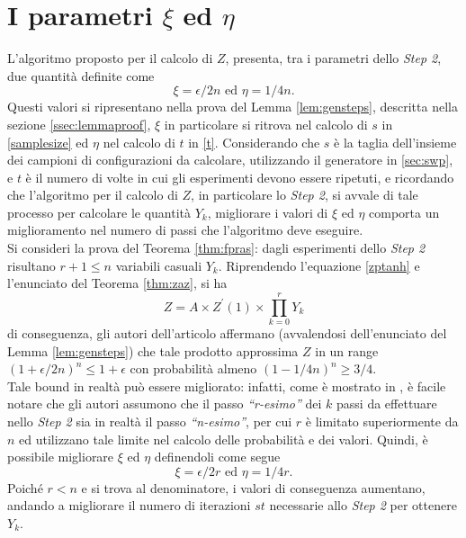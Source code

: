 \section{I parametri $\xi$ ed $\eta$}
L'algoritmo proposto per il calcolo di $Z$, presenta, tra i parametri dello \textit{Step 2}, due quantità definite come
\begin{equation}
	\xi = \epsilon/2n \text{ ed } \eta = 1/4n.
	\label{xieta}
\end{equation}
Questi valori si ripresentano nella prova del Lemma \ref{lem:gensteps}, descritta nella sezione \ref{ssec:lemmaproof}, $\xi$ in particolare si ritrova nel calcolo di $s$ in \ref{samplesize} ed $\eta$ nel calcolo di $t$ in \ref{t}.
Considerando che $s$ è la taglia dell'insieme dei campioni di configurazioni da calcolare, utilizzando il generatore in \ref{sec:swp}, e $t$ è il numero di volte in cui gli esperimenti devono essere ripetuti, e ricordando che l'algoritmo per il calcolo di $Z$, in particolare lo \textit{Step 2}, si avvale di tale processo per calcolare le quantità $Y_k$, migliorare i valori di $\xi$ ed $\eta$ comporta un miglioramento nel numero di passi che l'algoritmo deve eseguire.\\
Si consideri la prova del Teorema \ref{thm:fpras}: dagli esperimenti dello \textit{Step 2} risultano $r + 1 \leq n$ variabili casuali $Y_k$. Riprendendo l'equazione \ref{zptanh} e l'enunciato del Teorema \ref{thm:zaz}, si ha
\begin{equation}
	Z = A \times Z^{\prime}(1) \times \prod_{k=0}^{r}{Y_k}
	\label{zazuno}
\end{equation}
di conseguenza, gli autori dell'articolo affermano (avvalendosi dell'enunciato del Lemma \ref{lem:gensteps}) che tale prodotto approssima $Z$ in un range $(1 + \epsilon/2n)^{n} \leq 1 + \epsilon$ con probabilità almeno $(1 - 1/4n)^{n} \geq 3/4$.\\
Tale bound in realtà può essere migliorato: infatti, come è mostrato in \cite{rinaldi2016approximation}, è facile notare che gli autori assumono che il passo \textit{``r-esimo''} dei $k$ passi da effettuare nello \textit{Step 2} sia in realtà il passo \textit{``n-esimo''}, per cui $r$ è limitato superiormente da $n$ ed utilizzano tale limite nel calcolo delle probabilità e dei valori. Quindi, è possibile migliorare $\xi$ ed $\eta$ definendoli come segue
\begin{equation}
	\xi = \epsilon/2r \text{ ed } \eta = 1/4r.
	\label{xietar}
\end{equation}
Poiché $r < n$ e si trova al denominatore, i valori di conseguenza aumentano, andando a migliorare il numero di iterazioni $st$ necessarie allo \textit{Step 2} per ottenere $Y_k$.
